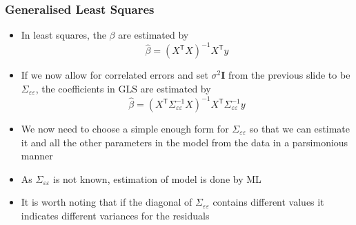 \documentclass{beamer}
\begin{document}
\begin{frame}
    \frametitle{Generalised Least Squares}
    \begin{itemize}
        \item In least squares, the $\beta$ are estimated by
        $$\hat{\beta} = (X^{\mathsf{T}}X)^{-1}X^{\mathsf{T}}y$$
        \item If we now allow for correlated errors and set $\sigma^2\mathbf{I}$ from the previous slide to be $\Sigma_{\varepsilon \varepsilon}$, the coefficients in GLS are estimated by
        $$\hat{\beta} = (X^{\mathsf{T}}\Sigma_{\varepsilon \varepsilon}^{-1}X)^{-1}X^{\mathsf{T}}\Sigma_{\varepsilon \varepsilon}^{-1}y$$
        \item We now need to choose a simple enough form for $\Sigma_{\varepsilon \varepsilon}$ so that we can estimate it and all the other parameters in the model from the data in a parsimonious manner
        \item As $\Sigma_{\varepsilon \varepsilon}$ is not known, estimation of model is done by ML
        \item It is worth noting that if the diagonal of $\Sigma_{\varepsilon \varepsilon}$ contains different values it indicates different variances for the residuals
    \end{itemize}
\end{frame}
\end{document}
